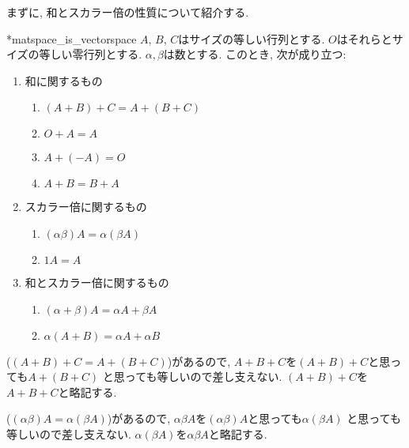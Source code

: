 まずに, 和とスカラー倍の性質について紹介する.
\begin{prop}
  \provelater**{matspace_is_vectorspace}
  $A$, $B$, $C$はサイズの等しい行列とする.
  $O$はそれらとサイズの等しい零行列とする.
  $\alpha,\beta$は数とする.
  このとき, 次が成り立つ:
  \begin{enumerate}
  \item 和に関するもの
  \begin{enumerate}
  \item {}
    \label{item:sum:c}
    $(A+B)+C=A+(B+C)$
  \item {}
    $O+A=A$
  \item {}
    $A+(-A)=O$
  \item {}
    $A+B=B+A$
  \end{enumerate}
  \item スカラー倍に関するもの
  \begin{enumerate}
  \item {}
    \label{item:sc:c}
    $(\alpha\beta)A=\alpha(\beta A)$
  \item {}
    $1A=A$
  \end{enumerate}  
  \item 和とスカラー倍に関するもの
  \begin{enumerate}
  \item {}
    $(\alpha+\beta)A=\alpha A+\beta A$
  \item {}
    $\alpha (A+B)=\alpha A+\alpha B$
  \end{enumerate}  
  \end{enumerate}
\end{prop}
\begin{remark}
  ($(A+B)+C=A+(B+C)$)があるので,
  $A+B+C$を$(A+B)+C$と思っても$A+(B+C)$
  と思っても等しいので差し支えない.
  $(A+B)+C$を$A+B+C$と略記する.
\end{remark}
\begin{remark}
  ($(\alpha\beta)A=\alpha(\beta A)$)があるので,
  $\alpha\beta A$を$(\alpha\beta)A$と思っても$\alpha(\beta A)$
  と思っても等しいので差し支えない.
  $\alpha(\beta A)$を$\alpha\beta A$と略記する.
\end{remark}

